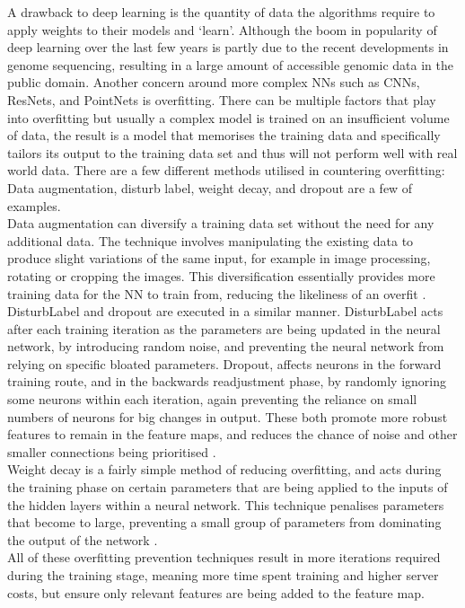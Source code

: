 A drawback to deep learning is the quantity of data the algorithms require to apply weights to their models and ‘learn’. Although the boom in popularity of deep learning over the last few years is partly due to the recent developments in genome sequencing, resulting in a large amount of accessible genomic data in the public domain. Another concern around more complex NNs such as CNNs, ResNets, and PointNets is overfitting.
There can be multiple factors that play into overfitting but usually a complex model is trained on an insufficient volume of data, the result is a model that memorises the training data and specifically tailors its output to the training data set and thus will not perform well with real world data. There are a few different methods utilised in countering overfitting: Data augmentation, disturb label, weight decay, and dropout are a few of examples.
\\[12pt]
Data augmentation can diversify a training data set without the need for any additional data. The technique involves manipulating the existing data to produce slight variations of the same input, for example in image processing, rotating or cropping the images. This diversification essentially provides more training data for the NN to train from, reducing the likeliness of an overfit \cite{mikolajczykDataAugmentationImproving2018}.
\\[12pt]
DisturbLabel \cite{xieDisturbLabelRegularizingCNN2016} and dropout \cite{srivastavaDropoutSimpleWay2014a} are executed in a similar manner. DisturbLabel acts after each training iteration as the parameters are being updated in the neural network, by introducing random noise, and preventing the neural network from relying on specific bloated parameters. Dropout, affects neurons in the forward training route, and in the backwards readjustment phase, by randomly ignoring some neurons within each iteration, again preventing the reliance on small numbers of neurons for big changes in output. These both promote more robust features to remain in the feature maps, and reduces the chance of noise and other smaller connections being prioritised \cite{xieDisturbLabelRegularizingCNN2016, srivastavaDropoutSimpleWay2014a}.
\\[12pt]
Weight decay is a fairly simple method of reducing overfitting, and acts during the training phase on certain parameters that are being applied to the inputs of the hidden layers within a neural network. This technique penalises parameters that become to large, preventing a small group of parameters from dominating the output of the network \cite{kroghSimpleWeightDecay1991}. 
\\[12pt]
All of these overfitting prevention techniques result in more iterations required during the training stage, meaning more time spent training and higher server costs, but ensure only relevant features are being added to the feature map. 

